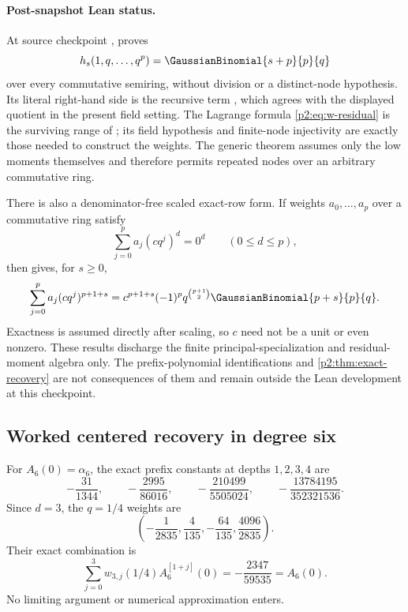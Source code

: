 \documentclass[11pt,oneside]{article}
\numberwithin{equation}{section}
\theoremstyle{definition}
\theoremstyle{remark}
\begin{document}
\paragraph{Post-snapshot Lean status.}
At source checkpoint ,
 proves
\[
 h_s(1,q,\ldots,q^p)=\GaussianBinomial{s+p}{p}{q}
\]
over every commutative semiring, without division or a distinct-node
hypothesis.  Its literal right-hand side is the recursive term
, which agrees with the displayed quotient
in the present field setting.  The Lagrange formula \eqref{p2:eq:w-residual} is
the surviving range of ; its
field hypothesis and finite-node injectivity are exactly those needed to
construct the weights.  The generic theorem
 assumes only the low moments
themselves and therefore permits repeated nodes over an arbitrary commutative
ring.

There is also a denominator-free scaled exact-row form.  If weights
\(a_0,\ldots,a_p\) over a commutative ring satisfy
\[
 \sum_{j=0}^{p}a_j(cq^j)^d=0^d\qquad(0\le d\le p),
\]
then  gives, for \(s\ge0\),
\[
 \sum_{j=0}^{p}a_j(cq^j)^{p+1+s}
 =c^{p+1+s}(-1)^p q^{\binom{p+1}{2}}\GaussianBinomial{p+s}{p}{q}.
\]
Exactness is assumed directly after scaling, so \(c\) need not be a unit or
even nonzero.  These results discharge the finite principal-specialization and
residual-moment algebra only.  The prefix-polynomial identifications and
\cref{p2:thm:exact-recovery} are not consequences
of them and remain outside the Lean development at this checkpoint.

\subsection{Worked centered recovery in degree six}

For $A_6(0)=\alpha_6$, the exact prefix constants at depths $1,2,3,4$ are
\begin{equation}
 -\frac{31}{1344},
 \qquad
 -\frac{2995}{86016},
 \qquad
 -\frac{210499}{5505024},
 \qquad
 -\frac{13784195}{352321536}.
 \label{p2:eq:A6-prefix-values}
\end{equation}
Since $d=3$, the $q=1/4$ weights are
\begin{equation}
 \left(
 -\frac1{2835},\frac4{135},-\frac{64}{135},\frac{4096}{2835}
 \right).
 \label{p2:eq:q14-weights3}
\end{equation}
Their exact combination is
\begin{equation}
 \sum_{j=0}^{3}w_{3,j}(1/4)A_6^{[1+j]}(0)
 =-\frac{2347}{59535}=A_6(0).
 \label{p2:eq:A6-exact-example}
\end{equation}
No limiting argument or numerical approximation enters.
\end{document}
